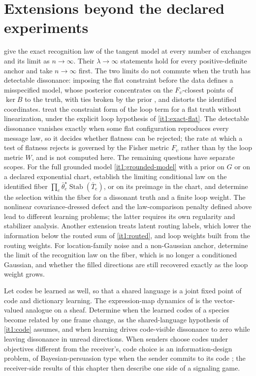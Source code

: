 \section{Extensions beyond the declared experiments}
\label{it1:ch-next}

 give the exact recognition law of the tangent model at every number of exchanges and its limit as $n\to\infty$. Their $\lambda\to\infty$ statements hold for every positive-definite anchor and take $n\to\infty$ first. The two limits do not commute when the truth has detectable dissonance: imposing the flat constraint before the data defines a misspecified model, whose posterior concentrates on the $F_\upsilon$-closest points of $\ker B$ to the truth, with ties broken by the prior \citep{Berk1966}, and distorts the identified coordinates.  treat the constraint form of the loop term for a flat truth without linearization, under the explicit loop hypothesis of \cref{it1:exact-flat}. The detectable dissonance vanishes exactly when some flat configuration reproduces every message law, so it decides whether flatness can be rejected; the rate at which a test of flatness rejects is governed by the Fisher metric $F_\upsilon$ rather than by the loop metric $W$, and is not computed here. The remaining questions have separate scopes. For the full grounded model \cref{it1:grounded-model} with a prior on $G$ or on a declared exponential chart, establish the limiting conditional law on the identified fiber $\prod_e\bar\theta^\star_e\operatorname{Stab}(\bar T_e)$, or on its preimage in the chart, and determine the selection within the fiber for a dissonant truth and a finite loop weight. The nonlinear covariance-dressed defect and the law-comparison penalty defined above lead to different learning problems; the latter requires its own regularity and stabilizer analysis. Another extension treats latent routing labels, which lower the information below the routed sum of \cref{it1:routed}, and loop weights built from the routing weights. For location-family noise and a non-Gaussian anchor, determine the limit of the recognition law on the fiber, which is no longer a conditioned Gaussian, and whether the filled directions are still recovered exactly as the loop weight grows.

Let codes be learned as well, so that a shared language is a joint fixed point of code and dictionary learning. The expression-map dynamics of \citet{HansenGhrist2021} is the vector-valued analogue on a sheaf. Determine when the learned codes of a species become related by one frame change, as the shared-language hypothesis of \cref{it1:code} assumes, and when learning drives code-visible dissonance to zero while leaving dissonance in unread directions. When senders choose codes under objectives different from the receiver's, code choice is an information-design problem, of Bayesian-persuasion type when the sender commits to its code \citep{KamenicaGentzkow2011}; the receiver-side results of this chapter then describe one side of a signaling game.


